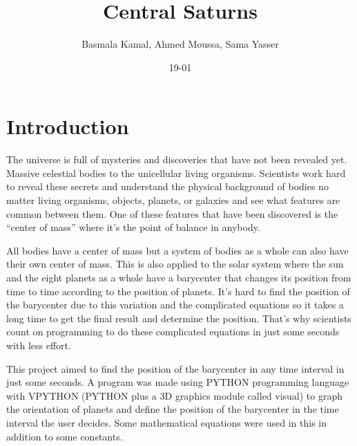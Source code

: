 \documentclass{article}
\title{Central Saturns}
\author{Basmala Kamal,
Ahmed Moussa,
Sama Yasser}
\date{19-01}
\begin{document}
\maketitle

\section{Introduction}
The universe is full of mysteries and discoveries that have not been revealed yet. Massive celestial bodies to the unicellular living organisms. Scientists work hard to reveal these secrets and understand the physical background of bodies no matter living organisms, objects, planets, or galaxies and see what features are common between them. One of these features that have been discovered is the “center of mass” where it’s the point of balance in anybody.
 
 All bodies have a center of mass but a system of bodies as a whole can also have their own center of mass. This is also applied to the solar system where the sun and the eight planets as a whole have a barycenter that changes its position from time to time according to the position of planets. It’s hard to find the position of the barycenter due to this variation and the complicated equations so it takes a long time to get the final result and determine the position. That’s why scientists count on programming to do these complicated equations in just some seconds with less effort.

 This project aimed to find the position of the barycenter in any time interval in just some seconds. A program was made using PYTHON programming language with VPYTHON (PYTHON plus a 3D graphics module called visual) to graph the orientation of planets and define the position of the barycenter in the time interval the user decides. Some mathematical equations were used in this in addition to some constants.
\end{document}
